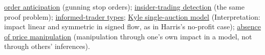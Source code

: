\begin{qfdefinition}
 \hyperref[def:order-anticipation]{order anticipation} (gunning stop orders); \hyperref[res:insider-trading-deterrence]{insider-trading detection} (the same proof problem); \hyperref[def:informed-trader-types]{informed-trader types}; \hyperref[mod:kyle-single-auction]{Kyle single-auction model} (Interpretation: impact linear and symmetric in signed flow, as in Harris's no-profit case); \hyperref[res:no-price-manipulation]{absence of price manipulation} (manipulation through one's own impact in a model, not through others' inferences).

\end{qfdefinition}
